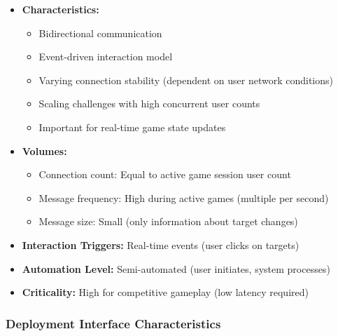 \begin{itemize}
    \item \textbf{Characteristics:}
          \begin{itemize}
              \item Bidirectional communication
              \item Event-driven interaction model
              \item Varying connection stability (dependent on user network conditions)
              \item Scaling challenges with high concurrent user counts
              \item Important for real-time game state updates
          \end{itemize}
    \item \textbf{Volumes:}
          \begin{itemize}
              \item Connection count: Equal to active game session user count
              \item Message frequency: High during active games (multiple per second)
              \item Message size: Small (only information about target changes)
          \end{itemize}
    \item \textbf{Interaction Triggers:} Real-time events (user clicks on targets)
    \item \textbf{Automation Level:} Semi-automated (user initiates, system processes)
    \item \textbf{Criticality:} High for competitive gameplay (low latency required)
\end{itemize}

\subsubsection{Deployment Interface Characteristics}


